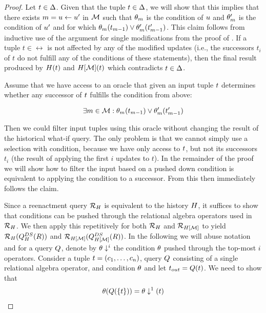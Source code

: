 \begin{proof}
\proofpar{$\dfull \subseteq \dslice$:}
Let $t \in \Delta$. Given that the tuple $t \in \Delta$, we will show that this implies that there exists $m = u \gets u'$ in $\mathcal{M}$ such that $\theta_m$ is the condition of $u$ and $\theta_{m}'$ is the condition of $u'$ and for which $\theta_m(t_{m -1}) \vee \theta_{m}'(t_{m -1}')$. This claim follows from inductive use of the  argument for single modifications from the proof of . If a tuple $t \in \rel$ is not affected by any of the modified updates (i.e., the successors $t_i$ of $t$ do not fulfill any of the conditions of these statements), then the final result produced by $H(t)$ and $H[\mathcal{M}](t)$ which contradicts $t \in \Delta$.

Assume that we have access to an oracle that given an input tuple $t$ determines whether any successor of $t$ fulfills the condition from above:

\[
  \exists m \in \mathcal{M}: \theta_m(t_{m -1}) \vee \theta_{m}'(t_{m -1}')
\]

Then we could filter input tuples using this oracle without changing the result of the historical what-if query. The only problem is that we cannot simply use a selection with condition, because we have only access to $t$, but not its successors $t_i$ (the result of applying the first $i$ updates to $t$). In the remainder of the proof we will show how to filter the input based on a pushed down condition is equivalent to applying the condition to a successor. From this then immediately follows the claim.

Since a reenactment query $\mathcal{R}_{H}$ is equivalent to the history $H$, it suffices to show that conditions can be pushed through the relational algebra operators used in $\mathcal{R}_{H}$. We then apply this repetitively for both $\mathcal{R}_{H}$ and $\mathcal{R}_{H[\mathcal{M}]}$ to yield $\mathcal{R}_{H}(Q_{H}^{DS}(R))$ and $\mathcal{R}_{H[\mathcal{M}]}(Q_{H[\mathcal{M}]}^{DS}(R))$.
In the following we will abuse notation and for a query $Q$, denote by ${\theta}\downarrow^{i}$ the condition $\theta$ pushed through the top-most $i$ operators.
Consider a tuple $t = (c_1, \ldots, c_n)$, query $Q$ consisting of a single relational algebra operator, and condition $\theta$ and let $t_{out} = Q(t)$.
We need to show that
\begin{align}
  \theta(Q(\{t\})) = {\theta}\downarrow^{1}(t)
  \label{eq:push-down-eq}
\end{align}


\end{proof}
